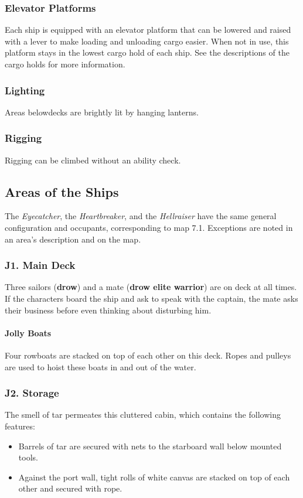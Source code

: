 \documentclass[10pt,a4paper,twoside,twocolumn,openany,nodeprecatedcode]{dndbook}
\begin{document}
\subsubsection{Elevator Platforms}
Each ship is equipped with an elevator platform that can be lowered and raised with a lever to make loading and unloading cargo easier. When not in use, this platform stays in the lowest cargo hold of each ship. See the descriptions of the cargo holds for more information.
\subsubsection{Lighting}
Areas belowdecks are brightly lit by hanging lanterns.
\subsubsection{Rigging}
Rigging can be climbed without an ability check.
\subsection{Areas of the Ships}
The \textit{Eyecatcher}, the \textit{Heartbreaker}, and the \textit{Hellraiser} have the same general configuration and occupants, corresponding to map 7.1. Exceptions are noted in an area's description and on the map.
\subsubsection{J1. Main Deck}
Three sailors (\textbf{drow}) and a mate (\textbf{drow elite warrior}) are on deck at all times. If the characters board the ship and ask to speak with the captain, the mate asks their business before even thinking about disturbing him.
\paragraph{Jolly Boats}
Four rowboats are stacked on top of each other on this deck. Ropes and pulleys are used to hoist these boats in and out of the water.
\subsubsection{J2. Storage}
The smell of tar permeates this cluttered cabin, which contains the following features:
\begin{itemize}

\item Barrels of tar are secured with nets to the starboard wall below mounted tools.
\item Against the port wall, tight rolls of white canvas are stacked on top of each other and secured with rope.
\end{itemize}
\end{document}
